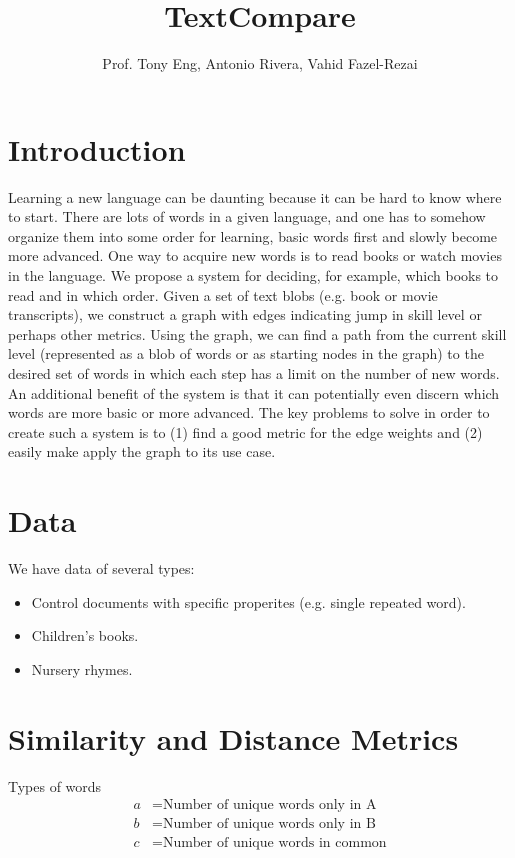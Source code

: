 \documentclass[10pt]{paper}
\title{TextCompare}
\author{Prof. Tony Eng, Antonio Rivera, Vahid Fazel-Rezai}
\begin{document}
\maketitle

\section{Introduction}

Learning a new language can be daunting because it can be hard to know where to start. There are lots of words in a given language, and one has to somehow organize them into some order for learning, basic words first and slowly become more advanced. One way to acquire new words is to read books or watch movies in the language. We propose a system for deciding, for example, which books to read and in which order. Given a set of text blobs (e.g. book or movie transcripts), we construct a graph with edges indicating jump in skill level or perhaps other metrics. Using the graph, we can find a path from the current skill level (represented as a blob of words or as starting nodes in the graph) to the desired set of words in which each step has a limit on the number of new words. An additional benefit of the system is that it can potentially even discern which words are more basic or more advanced. The key problems to solve in order to create such a system is to (1) find a good metric for the edge weights and (2) easily make apply the graph to its use case.

\section{Data}

We have data of several types:
\begin{itemize}
  \item Control documents with specific properites (e.g. single repeated word).
  \item Children's books.
  \item Nursery rhymes.
\end{itemize}

\section{Similarity and Distance Metrics}

Types of words
\begin{align*}
  a &= \text{Number of unique words only in A} \\
  b &= \text{Number of unique words only in B} \\
  c &= \text{Number of unique words in common}
\end{align*}
\end{document}
